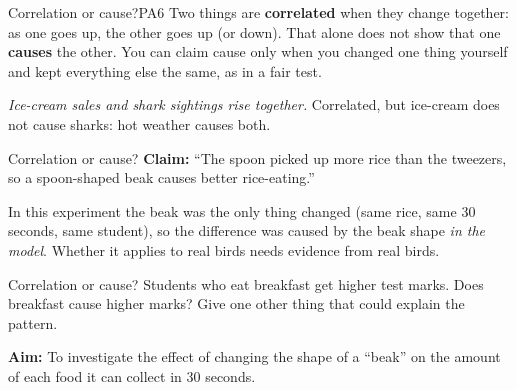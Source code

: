 \begin{technique}{Correlation or cause?}{PA6}
Two things are \textbf{correlated} when they change together: as one goes up, the other goes up (or down). That alone does not show that one \textbf{causes} the other. You can claim cause only when you changed one thing yourself and kept everything else the same, as in a fair test.

\smallskip
\emph{Ice-cream sales and shark sightings rise together.} Correlated, but ice-cream does not cause sharks: hot weather causes both.
\end{technique}

\begin{workedex}{Correlation or cause?}
\textbf{Claim:} ``The spoon picked up more rice than the tweezers, so a spoon-shaped beak causes better rice-eating.''

\smallskip
In this experiment the beak was the only thing changed (same rice, same 30 seconds, same student), so the difference was caused by the beak shape \emph{in the model}. Whether it applies to real birds needs evidence from real birds.
\end{workedex}

\begin{wedo}{Correlation or cause?}
Students who eat breakfast get higher test marks. Does breakfast cause higher marks? Give one other thing that could explain the pattern.
\answerbox{3.5cm}
\end{wedo}


\textbf{Aim:} To investigate the effect of changing the shape of a ``beak'' on the amount of each food it can collect in 30 seconds.


